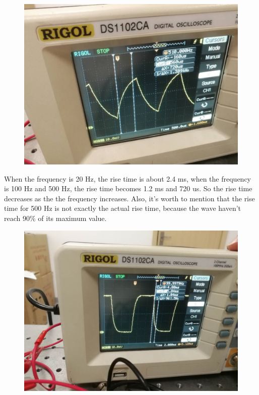 \documentclass[12pt]{article}
\begin{document}
\begin{figure}[H]
\centering
\includegraphics[scale=0.2]{Q2P3.jpg}
\end{figure}
When the frequency is 20 Hz, the rise time is about 2.4 ms, when the frequency is 100 Hz and 500 Hz, the rise time becomes 1.2 ms and 720 us. So the rise time decreases as the the frequency increases. Also, it's worth to mention that the rise time for 500 Hz is not exactly the actual rise time, because the wave haven't reach 90\% of its maximum value. 
\begin{figure}[H]
\centering
\includegraphics[scale=0.2]{Q2P4.jpg}
\end{figure}
\end{document}
